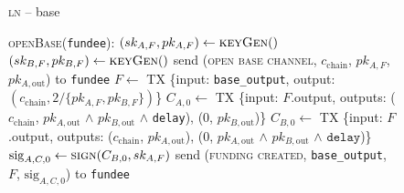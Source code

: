 \begin{figure}[H]
  \begin{processbox}{\textsc{ln} -- base}
    \begin{algorithmic}[1]
      \State \textsc{openBase}(\texttt{fundee}):
      \Indent
        \State $(sk_{A, F}, pk_{A, F}) \gets \textsc{keyGen}()$
          \State $(sk_{B, F}, pk_{B, F}) \gets \textsc{keyGen}()$
        \Else \: 
          \State send (\textsc{open base channel}, $c_{\mathrm{chain}}$, $pk_{A,
          F}$, $pk_{A, \mathrm{out}}$) to \texttt{fundee}
          \State {}
          \State {}
          \State {}
          \State {}
          \State {}
        \EndIf
        \State $F \gets$ TX \{input: \texttt{base\_output}, output:
        $(c_{\mathrm{chain}}, 2/\{pk_{A, F}, pk_{B, F}\})$\}
          \State $C_{A, 0} \gets$ TX \{input: $F$.output, outputs:
          ($c_{\mathrm{chain}}$, $pk_{A, \mathrm{out}}$ $\wedge$ $pk_{B,
          \mathrm{out}}$ $\wedge$ \texttt{delay}), ($0$, $pk_{B,
          \mathrm{out}}$)\}
          \State $C_{B, 0} \gets$ TX \{input: $F$.output, outputs:
          ($c_{\mathrm{chain}}$, $pk_{A, \mathrm{out}}$), ($0$, $pk_{A,
          \mathrm{out}}$ $\wedge$ $pk_{B, \mathrm{out}}$ $\wedge$
          $\texttt{delay}$)\}
          \State $\mathrm{sig}_{A, C, 0} \gets \textsc{sign}(C_{B, 0}, sk_{A,
          F})$
          \State send (\textsc{funding created}, \texttt{base\_output},
          $F$, $\mathrm{sig}_{A, C, 0}$) to \texttt{fundee}
          \State {}
          \State {}
          \State {}
          \State {}
          \State {}
\end{algorithmic}
\end{processbox}
\end{figure}
